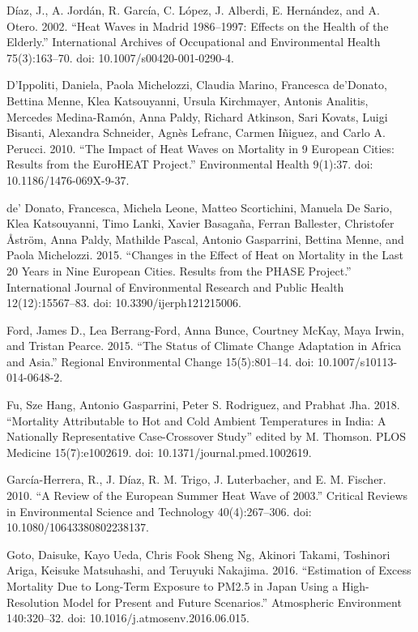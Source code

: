 \documentclass[12pt]{article}
\begin{document}
Díaz, J., A. Jordán, R. García, C. López, J. Alberdi, E. Hernández, and
A. Otero. 2002. ``Heat Waves in Madrid 1986--1997: Effects on the Health
of the Elderly.'' International Archives of Occupational and
Environmental Health 75(3):163--70. doi: 10.1007/s00420-001-0290-4.

D'Ippoliti, Daniela, Paola Michelozzi, Claudia Marino, Francesca
de'Donato, Bettina Menne, Klea Katsouyanni, Ursula Kirchmayer, Antonis
Analitis, Mercedes Medina-Ramón, Anna Paldy, Richard Atkinson, Sari
Kovats, Luigi Bisanti, Alexandra Schneider, Agnès Lefranc, Carmen
Iñiguez, and Carlo A. Perucci. 2010. ``The Impact of Heat Waves on
Mortality in 9 European Cities: Results from the EuroHEAT Project.''
Environmental Health 9(1):37. doi: 10.1186/1476-069X-9-37.

de' Donato, Francesca, Michela Leone, Matteo Scortichini, Manuela De
Sario, Klea Katsouyanni, Timo Lanki, Xavier Basagaña, Ferran Ballester,
Christofer Åström, Anna Paldy, Mathilde Pascal, Antonio Gasparrini,
Bettina Menne, and Paola Michelozzi. 2015. ``Changes in the Effect of
Heat on Mortality in the Last 20 Years in Nine European Cities. Results
from the PHASE Project.'' International Journal of Environmental
Research and Public Health 12(12):15567--83. doi:
10.3390/ijerph121215006.

Ford, James D., Lea Berrang-Ford, Anna Bunce, Courtney McKay, Maya
Irwin, and Tristan Pearce. 2015. ``The Status of Climate Change
Adaptation in Africa and Asia.'' Regional Environmental Change
15(5):801--14. doi: 10.1007/s10113-014-0648-2.

Fu, Sze Hang, Antonio Gasparrini, Peter S. Rodriguez, and Prabhat Jha.
2018. ``Mortality Attributable to Hot and Cold Ambient Temperatures in
India: A Nationally Representative Case-Crossover Study'' edited by M.
Thomson. PLOS Medicine 15(7):e1002619. doi:
10.1371/journal.pmed.1002619.

García-Herrera, R., J. Díaz, R. M. Trigo, J. Luterbacher, and E. M.
Fischer. 2010. ``A Review of the European Summer Heat Wave of 2003.''
Critical Reviews in Environmental Science and Technology 40(4):267--306.
doi: 10.1080/10643380802238137.

Goto, Daisuke, Kayo Ueda, Chris Fook Sheng Ng, Akinori Takami, Toshinori
Ariga, Keisuke Matsuhashi, and Teruyuki Nakajima. 2016. ``Estimation of
Excess Mortality Due to Long-Term Exposure to PM2.5 in Japan Using a
High-Resolution Model for Present and Future Scenarios.'' Atmospheric
Environment 140:320--32. doi: 10.1016/j.atmosenv.2016.06.015.
\end{document}
